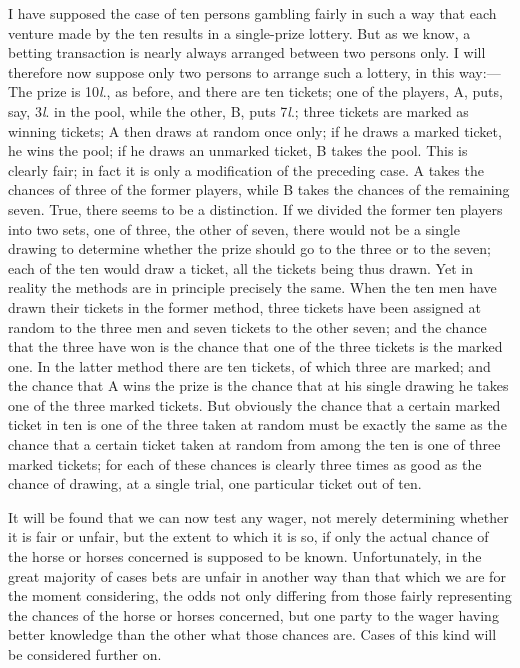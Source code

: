 \documentclass[letterpaper,12pt,oneside,openany]{memoir}
\begin{document}
I have supposed the case of ten persons gambling
fairly in such a way that each venture made by the ten
results in a single-prize lottery. But as we know, a
betting transaction is nearly always arranged between
two persons only. I will therefore now suppose only
two persons to arrange such a lottery, in this way:---The
prize is 10\textit{l}., as before, and there are ten tickets;
one of the players, A, puts, say, 3\textit{l}. in the pool, while
the other, B, puts 7\textit{l}.; three tickets are marked as
winning tickets; A then draws at random once only;
if he draws a marked ticket, he wins the pool; if he
draws an unmarked ticket, B takes the pool. This is
clearly fair; in fact it is only a modification of the
preceding case. A takes the chances of three of the
former players, while B takes the chances of the remaining
seven. True, there seems to be a distinction.
If we divided the former ten players into two sets, one
of three, the other of seven, there would not be a single
drawing to determine whether the prize should go to
the three or to the seven; each of the ten would draw
a ticket, all the tickets being thus drawn. Yet in
reality the methods are in principle precisely the same.
When the ten men have drawn their tickets in the
former method, three tickets have been assigned at
random to the three men and seven tickets to the other
seven; and the chance that the three have won is the
chance that one of the three tickets is the marked one.
In the latter method there are ten tickets, of which
three are marked; and the chance that A wins the
prize is the chance that at his single drawing he takes
one of the three marked tickets. But obviously the
chance that a certain marked ticket in ten is one of the
three taken at random must be exactly the same as the
chance that a certain ticket taken at random from
among the ten is one of three marked tickets; for each
of these chances is clearly three times as good as the
chance of drawing, at a single trial, one particular ticket
out of ten.

It will be found that we can now test any wager,
not merely determining whether it is fair or unfair, but
the extent to which it is so, if only the actual chance of
the horse or horses concerned is supposed to be known.
Unfortunately, in the great majority of cases bets are
unfair in another way than that which we are for the
moment considering, the odds not only differing from
those fairly representing the chances of the horse or
horses concerned, but one party to the wager having
better knowledge than the other what those chances
are. Cases of this kind will be considered further on.
\end{document}

